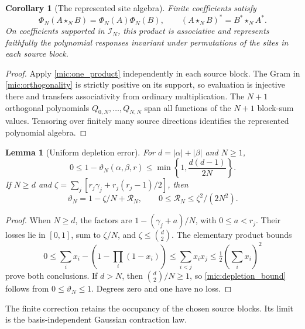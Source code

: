 \documentclass[11pt,a4paper]{amsart}
\numberwithin{equation}{section}
\newtheorem{lemma}[theorem]{Lemma}
\newtheorem{corollary}[theorem]{Corollary}
\theoremstyle{definition}
\theoremstyle{remark}
\begin{document}
\begin{corollary}[The represented site algebra]\label{mic:represented}
Finite coefficients satisfy
\begin{equation}\label{mic:evaluation_product}
 \Phi_N(A\star_NB)=\Phi_N(A)\Phi_N(B),\qquad
 (A\star_NB)^*=B^*\star_NA^*.
\end{equation}
On coefficients supported in $\mathcal I_N$, this product is associative and represents faithfully the polynomial responses invariant under permutations of the sites in each source block.
\end{corollary}
\begin{proof}
Apply \eqref{mic:one_product} independently in each source block. The Gram in \eqref{mic:orthogonality} is strictly positive on its support, so evaluation is injective there and transfers associativity from ordinary multiplication. The $N+1$ orthogonal polynomials $Q_{0,N},\ldots,Q_{N,N}$ span all functions of the $N+1$ block-sum values. Tensoring over finitely many source directions identifies the represented polynomial algebra.
\end{proof}

\begin{lemma}[Uniform depletion error]\label{mic:depletion}
For $d=|\alpha|+|\beta|$ and $N\ge1$,
\begin{equation}\label{mic:depletion_bound}
 0\le1-\vartheta_N(\alpha,\beta,r)
 \le\min\left\{1,\frac{d(d-1)}{2N}\right\}.
\end{equation}
If $N\ge d$ and $\zeta=\sum_j[r_j\gamma_j+r_j(r_j-1)/2]$, then
\begin{equation}\label{mic:first_correction}
 \vartheta_N=1-\zeta/N+\mathcal R_N,\qquad
 0\le\mathcal R_N\le\zeta^2/(2N^2).
\end{equation}
\end{lemma}
\begin{proof}
When $N\ge d$, the factors are $1-(\gamma_j+a)/N$, with $0\le a<r_j$. Their losses lie in $[0,1]$, sum to $\zeta/N$, and $\zeta\le\binom d2$. The elementary product bounds
\[
 0\le\sum_i x_i-\left(1-\prod_i(1-x_i)\right)
 \le\sum_{i<j}x_ix_j\le\tfrac12\left(\sum_i x_i\right)^2
\]
prove both conclusions. If $d>N$, then $\binom d2/N\ge1$, so \eqref{mic:depletion_bound} follows from $0\le\vartheta_N\le1$. Degrees zero and one have no loss.
\end{proof}
The finite correction retains the occupancy of the chosen source blocks. Its limit is the basis-independent Gaussian contraction law.
\end{document}
